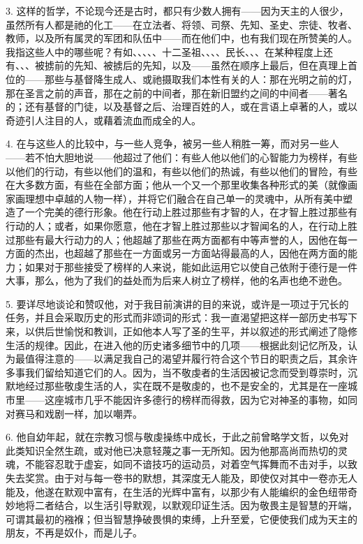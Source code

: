 3. 这样的哲学，不论现今还是古时，都只有少数人拥有——因为天主的人很少，虽然所有人都是祂的化工——在立法者、将领、司祭、先知、圣史、宗徒、牧者、教师，以及所有属灵的军团和队伍中——而在他们中，也有我们现在所赞美的人。我指这些人中的哪些呢？有如、、、、、十二圣祖、、、、民长、、、在某种程度上还有、、、被掳前的先知、被掳后的先知，以及——虽然在顺序上最后，但在真理上首位的——那些与基督降生成人、或祂摄取我们本性有关的人：那在光明之前的灯，那在圣言之前的声音，那在之前的中间者，那在新旧盟约之间的中间者——著名的；还有基督的门徒，以及基督之后、治理百姓的人，或在言语上卓著的人，或以奇迹引人注目的人，或藉着流血而成全的人。\par

4. 在与这些人的比较中，与一些人竞争，被另一些人稍胜一筹，而对另一些人——若不怕大胆地说——他超过了他们：有些人他以他们的心智能力为榜样，有些以他们的行动，有些以他们的温和，有些以他们的热诚，有些以他们的冒险，有些在大多数方面，有些在全部方面；他从一个又一个那里收集各种形式的美（就像画家画理想中卓越的人物一样），并将它们融合在自己单一的灵魂中，从所有美中塑造了一个完美的德行形象。他在行动上胜过那些有才智的人，在才智上胜过那些有行动的人；或者，如果你愿意，他在才智上胜过那些以才智闻名的人，在行动上胜过那些有最大行动力的人；他超越了那些在两方面都有中等声誉的人，因他在每一方面的杰出，也超越了那些在一方面或另一方面站得最高的人，因他在两方面的能力；如果对于那些接受了榜样的人来说，能如此运用它以使自己依附于德行是一件大事，那么，他为了我们的益处而为后来人树立了榜样，他的名声也绝不逊色。\par

5. 要详尽地谈论和赞叹他，对于我目前演讲的目的来说，或许是一项过于冗长的任务，并且会采取历史的形式而非颂词的形式：我一直渴望把这样一部历史书写下来，以供后世愉悦和教训，正如他本人写了圣的生平，并以叙述的形式阐述了隐修生活的规律。因此，在进入他的历史诸多细节中的几项——根据此刻记忆所及，认为最值得注意的——以满足我自己的渴望并履行符合这个节日的职责之后，其余许多事我们留给知道它们的人。因为，当不敬虔者的生活因被记念而受到尊崇时，沉默地经过那些敬虔生活的人，实在既不是敬虔的，也不是安全的，尤其是在一座城市里——这座城市几乎不能因许多德行的榜样而得救，因为它对神圣的事物，如同对赛马和戏剧一样，加以嘲弄。\par

6. 他自幼年起，就在宗教习惯与敬虔操练中成长，于此之前曾略学文哲，以免对此类知识全然生疏，或对他已决意轻蔑之事一无所知。因为他那高尚而热切的灵魂，不能容忍耽于虚妄，如同不谙技巧的运动员，对着空气挥舞而不击对手，以致失去奖赏。由于对与每一卷书的默想，其深度无人能及，即使仅对其中一卷亦无人能及，他遂在默观中富有，在生活的光辉中富有，以那少有人能编织的金色纽带奇妙地将二者结合，以生活引导默观，以默观印证生活。因为敬畏主是智慧的开端，可谓其最初的襁褓；但当智慧挣破畏惧的束缚，上升至爱，它便使我们成为天主的朋友，不再是奴仆，而是儿子。\par

